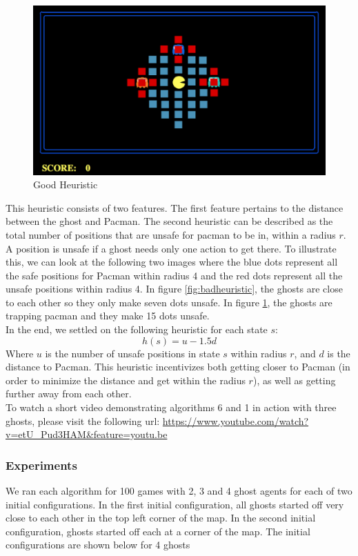 \documentclass[11pt]{article}
\begin{document}
\begin{multicols}{2}
\begin{figure}[H]
	\includegraphics[width=\columnwidth]{goodheuristic.png}
	\caption{Good Heuristic}
	\label{fig:goodheuristic}
\end{figure}



This heuristic consists of two features. The first feature pertains to the distance between the ghost and Pacman. The second heuristic can be described as the total number of positions that are unsafe for pacman to be in, within a radius $r$. A position is unsafe if a ghost needs only one action to get there. To illustrate this, we can look at the following two images where the blue dots represent all the safe positions for Pacman within radius 4 and the red dots represent all the unsafe positions within radius 4. In figure \ref{fig:badheuristic}, the ghosts are close to each other so they only make seven dots unsafe. In figure \ref{fig:goodheuristic}, the ghosts are trapping pacman and they make 15 dots unsafe.\\ 

In the end, we settled on the following heuristic for each state $s$:
$$h(s) = u - 1.5d$$ Where $u$ is the number of unsafe positions in state $s$ within radius $r$, and $d$ is the distance to Pacman. This heuristic incentivizes both getting closer to Pacman (in order to minimize the distance and get within the radius $r$), as well as getting further away from each other.\\
To watch a short video demonstrating algorithms 6 and 1 in action with three ghosts, please visit the following url: \url{https://www.youtube.com/watch?v=etU_Pud3HAM&feature=youtu.be}



\subsubsection{Experiments}
We ran each algorithm for 100 games with 2, 3 and 4 ghost agents for each of two initial configurations. In the first initial configuration, all ghosts started off very close to each other in the top left corner of the map. In the second initial configuration, ghosts started off each at a corner of the map. The initial configurations are shown below for 4 ghosts


\end{multicols}
\end{document}
